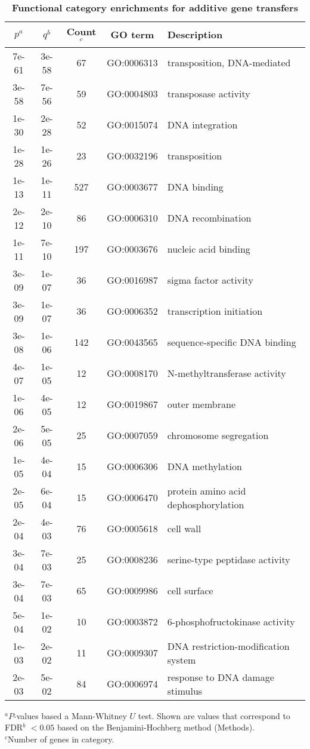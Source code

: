 \documentclass[12pt]{article}
\begin{document}
\begin{table}[!ht]

\caption{{\bf Functional category enrichments for additive gene
  transfers}}
\vspace{1ex}

\noindent \begin{centering}
\begin{tabular}{ccccl}
\hline 
$p^a$ & $q^b$ & Count$^c$ & GO term & Description \\
\hline 
7e-61 & 3e-58 & 67 & GO:0006313 & transposition, DNA-mediated\\
3e-58 & 7e-56 & 59 & GO:0004803 & transposase activity\\
1e-30 & 2e-28 & 52 & GO:0015074 & DNA integration\\
1e-28 & 1e-26 & 23 & GO:0032196 & transposition\\
1e-13 & 1e-11 & 527 & GO:0003677 & DNA binding\\
2e-12 & 2e-10 & 86 & GO:0006310 & DNA recombination\\
1e-11 & 7e-10 & 197 & GO:0003676 & nucleic acid binding\\
3e-09 & 1e-07 & 36 & GO:0016987 & sigma factor activity\\
3e-09 & 1e-07 & 36 & GO:0006352 & transcription initiation\\
3e-08 & 1e-06 & 142 & GO:0043565 & sequence-specific DNA binding\\
4e-07 & 1e-05 & 12 & GO:0008170 & N-methyltransferase activity\\
1e-06 & 4e-05 & 12 & GO:0019867 & outer membrane\\
2e-06 & 5e-05 & 25 & GO:0007059 & chromosome segregation\\
1e-05 & 4e-04 & 15 & GO:0006306 & DNA methylation\\
2e-05 & 6e-04 & 15 & GO:0006470 & protein amino acid dephosphorylation\\
2e-04 & 4e-03 & 76 & GO:0005618 & cell wall\\
3e-04 & 7e-03 & 25 & GO:0008236 & serine-type peptidase activity\\
3e-04 & 7e-03 & 65 & GO:0009986 & cell surface\\
5e-04 & 1e-02 & 10 & GO:0003872 & 6-phosphofructokinase activity\\
1e-03 & 2e-02 & 11 & GO:0009307 & DNA restriction-modification system\\
2e-03 & 5e-02 & 84 & GO:0006974 & response to DNA damage stimulus\\
\hline 
\end{tabular}
\par\end{centering}
\begin{flushleft}
$^a$$P$-values based a Mann-Whitney $U$ test.  Shown are values that
correspond to FDR$^b$  $<0.05$ based on the 
Benjamini-Hochberg method (Methods).\\
$^c$Number of genes in category.\\
\end{flushleft}
\label{tab:go-events}
\end{table}
\end{document}
